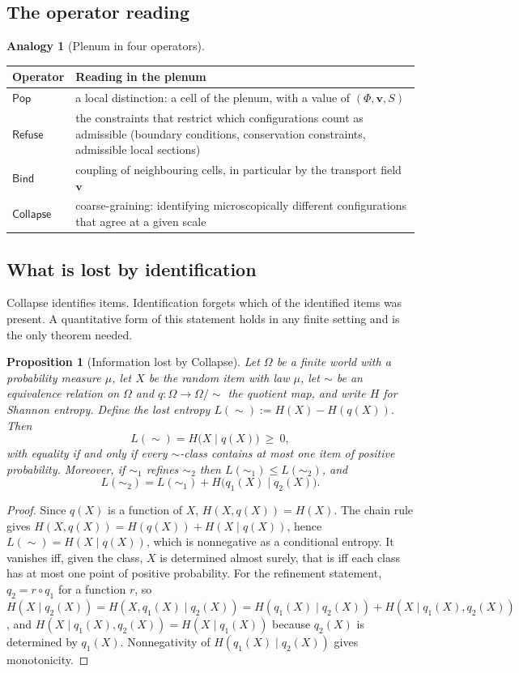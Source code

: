 \documentclass[11pt]{article}
\newcommand{\Pop}{\mathsf{Pop}}
\newcommand{\Refuse}{\mathsf{Refuse}}
\newcommand{\Bind}{\mathsf{Bind}}
\newcommand{\Coll}{\mathsf{Collapse}}
\newcommand{\Om}{\Omega}
\theoremstyle{definition}
\newtheorem{analogy}[definition]{Analogy}
\theoremstyle{plain}
\newtheorem{proposition}[definition]{Proposition}
\theoremstyle{remark}
\begin{document}
\subsection{The operator reading}

\begin{analogy}[Plenum in four operators]\label{an:plenum}
\begin{center}
\begin{tabular}{@{}lp{}@{}}
\toprule
Operator & Reading in the plenum\\
\midrule
$\Pop$ & a local distinction: a cell of the plenum, with a value of $(\Phi,\mathbf v,S)$\\
$\Refuse$ & the constraints that restrict which configurations count as admissible (boundary conditions, conservation constraints, admissible local sections)\\
$\Bind$ & coupling of neighbouring cells, in particular by the transport field $\mathbf v$\\
$\Coll$ & coarse-graining: identifying microscopically different configurations that agree at a given scale\\
\bottomrule
\end{tabular}
\end{center}
\end{analogy}

\subsection{What is lost by identification}

Collapse identifies items. Identification forgets which of the identified items was present. A quantitative form of this statement holds in any finite setting and is the only theorem needed.

\begin{proposition}[Information lost by Collapse]\label{prop:lost}
Let $\Om$ be a finite world with a probability measure $\mu$, let $X$ be the random item with law $\mu$, let $\sim$ be an equivalence relation on $\Om$ and $q:\Om\to\Om/{\sim}$ the quotient map, and write $H$ for Shannon entropy. Define the \emph{lost entropy} $L(\sim):=H(X)-H(q(X))$. Then
\[
L(\sim)=H\big(X\mid q(X)\big)\ \ge\ 0,
\]
with equality if and only if every $\sim$-class contains at most one item of positive probability. Moreover, if $\sim_1$ refines $\sim_2$ then $L(\sim_1)\le L(\sim_2)$, and
\[
L(\sim_2)=L(\sim_1)+H\big(q_1(X)\mid q_2(X)\big).
\]
\end{proposition}
\begin{proof}
Since $q(X)$ is a function of $X$, $H(X,q(X))=H(X)$. The chain rule gives $H(X,q(X))=H(q(X))+H(X\mid q(X))$, hence $L(\sim)=H(X\mid q(X))$, which is nonnegative as a conditional entropy. It vanishes iff, given the class, $X$ is determined almost surely, that is iff each class has at most one point of positive probability. For the refinement statement, $q_2=r\circ q_1$ for a function $r$, so $H(X\mid q_2(X))=H(X,q_1(X)\mid q_2(X))=H(q_1(X)\mid q_2(X))+H(X\mid q_1(X),q_2(X))$, and $H(X\mid q_1(X),q_2(X))=H(X\mid q_1(X))$ because $q_2(X)$ is determined by $q_1(X)$. Nonnegativity of $H(q_1(X)\mid q_2(X))$ gives monotonicity.
\end{proof}
\end{document}
